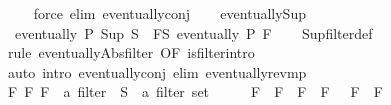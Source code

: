 \begin{isabellebody}
\ \ \ \isamarkupfalse%
\ {\isacharparenleft}{\kern0pt}force\ elim{\isacharbang}{\kern0pt}{\isacharcolon}{\kern0pt}\ eventually{\isacharunderscore}{\kern0pt}conj{\isacharparenright}{\kern0pt}{\isacharplus}{\kern0pt}\isanewline
\ \ \isamarkupfalse%
%
\endisatagproof
{\isafoldproof}%
%
\isadelimproof
\isanewline
%
\endisadelimproof
\isanewline
{}\isamarkupfalse%
\ eventually{\isacharunderscore}{\kern0pt}Sup{\isacharcolon}{\kern0pt}\isanewline
\ \ {\isachardoublequoteopen}eventually\ P\ {\isacharparenleft}{\kern0pt}Sup\ S{\isacharparenright}{\kern0pt}\ {\isasymlongleftrightarrow}\ {\isacharparenleft}{\kern0pt}{\isasymforall}F{\isasymin}S{\isachardot}{\kern0pt}\ eventually\ P\ F{\isacharparenright}{\kern0pt}{\isachardoublequoteclose}\isanewline
%
\isadelimproof
\ \ %
\endisadelimproof
%
\isatagproof
{}\isamarkupfalse%
\ Sup{\isacharunderscore}{\kern0pt}filter{\isacharunderscore}{\kern0pt}def\isanewline
\ \ \isamarkupfalse%
\ {\isacharparenleft}{\kern0pt}rule\ eventually{\isacharunderscore}{\kern0pt}Abs{\isacharunderscore}{\kern0pt}filter\ {\isacharbrackleft}{\kern0pt}OF\ is{\isacharunderscore}{\kern0pt}filter{\isachardot}{\kern0pt}intro{\isacharbrackright}{\kern0pt}{\isacharparenright}{\kern0pt}\isanewline
\ \ \isamarkupfalse%
\ {\isacharparenleft}{\kern0pt}auto\ intro{\isacharcolon}{\kern0pt}\ eventually{\isacharunderscore}{\kern0pt}conj\ elim{\isacharbang}{\kern0pt}{\isacharcolon}{\kern0pt}\ eventually{\isacharunderscore}{\kern0pt}rev{\isacharunderscore}{\kern0pt}mp{\isacharparenright}{\kern0pt}\isanewline
\ \ \isamarkupfalse%
%
\endisatagproof
{\isafoldproof}%
%
\isadelimproof
\isanewline
%
\endisadelimproof
\isanewline
{}\isamarkupfalse%
%
\isadelimproof
\ %
\endisadelimproof
%
\isatagproof
{}\isamarkupfalse%
\isanewline
\ \ \isamarkupfalse%
\ F\ F{\isacharprime}{\kern0pt}\ F{\isacharprime}{\kern0pt}{\isacharprime}{\kern0pt}\ {\isacharcolon}{\kern0pt}{\isacharcolon}{\kern0pt}\ {\isachardoublequoteopen}{\isacharprime}{\kern0pt}a\ filter{\isachardoublequoteclose}\ \ S\ {\isacharcolon}{\kern0pt}{\isacharcolon}{\kern0pt}\ {\isachardoublequoteopen}{\isacharprime}{\kern0pt}a\ filter\ set{\isachardoublequoteclose}\isanewline
\ \ \isacommand{{\isacharbraceleft}{\kern0pt}}\isamarkupfalse%
\ \isamarkupfalse%
\ {\isachardoublequoteopen}F\ {\isacharless}{\kern0pt}\ F{\isacharprime}{\kern0pt}\ {\isasymlongleftrightarrow}\ F\ {\isasymle}\ F{\isacharprime}{\kern0pt}\ {\isasymand}\ {\isasymnot}\ F{\isacharprime}{\kern0pt}\ {\isasymle}\ F{\isachardoublequoteclose}\isanewline

\end{isabellebody}
